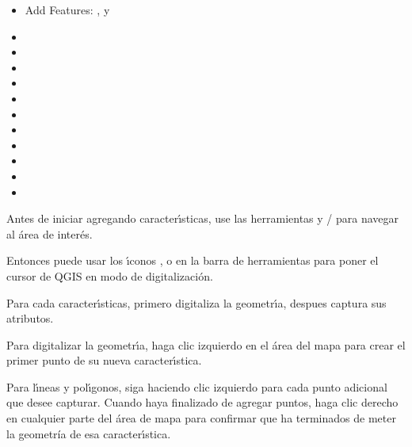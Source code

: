 \begin{itemize}
\item Add Features: ,
   y
\item {}
\item {}
\item {}
\item {}
\item {}
\item {}
\item {}
\item {}
\item {}
\item {}
\item {}
\end{itemize}


Antes de iniciar agregando caracter\'{\i}sticas, use las herramientas 
y / 
para navegar al \'area de inter\'es.

Entonces puede usar los \'{\i}conos ,
 o
 en la barra de herramientas para poner el cursor de QGIS
en modo de digitalizaci\'on.

Para cada caracter\'{\i}sticas, primero digitaliza la geometr\'{\i}a, despues captura sus atributos.

Para digitalizar la geometr\'{\i}a, haga clic izquierdo en el \'area del mapa para crear el primer
punto de su nueva caracter\'{\i}stica.

Para l\'{\i}neas y pol\'{\i}gonos, siga haciendo clic izquierdo para cada punto adicional
que desee capturar. Cuando haya finalizado de agregar puntos,
haga clic derecho en cualquier parte del \'area de mapa para confirmar que ha terminados de meter
la geometr\'{i}a de esa caracter\'{\i}stica.

